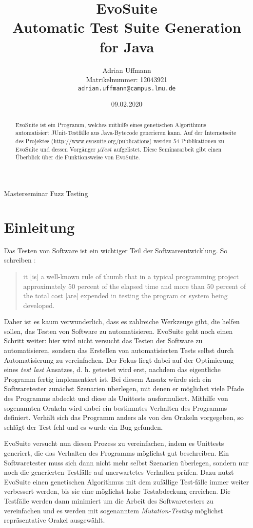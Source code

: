 \documentclass[a4paper,11pt]{article}
\title{\textbf{EvoSuite}\\
Automatic Test Suite Generation for Java}
\author{Adrian Uffmann\\
Matrikelnummer: 12043921\\
\texttt{adrian.uffmann@campus.lmu.de}}
\date{09.02.2020}
\begin{document}
\maketitle

\begin{center}
Masterseminar Fuzz Testing
\end{center}

\begin{abstract}
EvoSuite ist ein Programm, welches mithilfe eines genetischen Algorithmus automatisiert JUnit-Testfälle aus Java-Bytecode generieren kann.
Auf der Internetseite des Projektes (\url{http://www.evosuite.org/publications}) werden 54 Publikationen zu EvoSuite und dessen Vorgänger ${\mu}Test$ aufgelistet.
Diese Seminararbeit gibt einen Überblick über die Funktionsweise von EvoSuite.
\end{abstract}

\section{Einleitung}

Das Testen von Software ist ein wichtiger Teil der Softwareentwicklung.
So schreiben \citet{myers2004art}:
\begin{quote}
it [is] a well-known rule of thumb that in a typical programming project approximately 50 percent of the elapsed time and more than 50 percent of the total cost [are] expended in testing the program or system being developed.
\end{quote}
Daher ist es kaum verwunderlich, dass es zahlreiche Werkzeuge gibt, die helfen sollen, das Testen von Software zu automatisieren.
EvoSuite geht noch einen Schritt weiter: hier wird nicht versucht das Testen der Software zu automatisieren, sondern das Erstellen von automatisierten Tests selbst durch Automatisierung zu vereinfachen.
Der Fokus liegt dabei auf der Optimierung eines \textit{test last} Ansatzes, d. h. getestet wird erst, nachdem das eigentliche Programm fertig implementiert ist.
Bei diesem Ansatz würde sich ein Softwaretester zunächst Szenarien überlegen, mit denen er möglichst viele Pfade des Programms abdeckt und diese als Unittests ausformuliert.
Mithilfe von sogenannten Orakeln wird dabei ein bestimmtes Verhalten des Programms definiert.
Verhält sich das Programm anders als von den Orakeln vorgegeben, so schlägt der Test fehl und es wurde ein Bug gefunden.

EvoSuite versucht nun diesen Prozess zu vereinfachen, indem es Unittests generiert, die das Verhalten des Programms möglichst gut beschreiben.
Ein Softwaretester muss sich dann nicht mehr selbst Szenarien überlegen, sondern nur noch die generierten Testfälle auf unerwartetes Verhalten prüfen.
Dazu nutzt EvoSuite einen genetischen Algorithmus mit dem zufällige Test-fälle immer weiter verbessert werden, bis sie eine möglichst hohe Testabdeckung erreichen.
Die Testfälle werden dann minimiert um die Arbeit des Softwaretesters zu vereinfachen und es werden mit sogenanntem \textit{Mutation-Testing} möglichst repräsentative Orakel ausgewählt.
\end{document}
